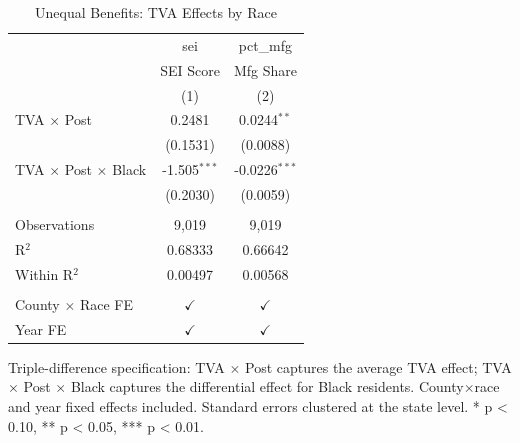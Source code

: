 
\begin{table}[htbp]
   \caption{\label{tab:race} Unequal Benefits: TVA Effects by Race}
   \bigskip
   \centering
   \begin{tabular}{lcc}
      \toprule
                                  & sei            & pct\_mfg\\   
                                  & SEI Score      & Mfg Share \\   
                                  & (1)            & (2)\\  
      \midrule 
      TVA $\times$ Post                  & 0.2481         & 0.0244$^{**}$\\   
                                  & (0.1531)       & (0.0088)\\   
      TVA $\times$ Post $\times$ Black            & -1.505$^{***}$ & -0.0226$^{***}$\\   
                                  & (0.2030)       & (0.0059)\\   
       \\
      Observations                & 9,019          & 9,019\\  
      R$^2$                       & 0.68333        & 0.66642\\  
      Within R$^2$                & 0.00497        & 0.00568\\  
       \\
      County $\times$ Race FE  & $\checkmark$   & $\checkmark$\\   
      Year FE          & $\checkmark$   & $\checkmark$\\   
      \bottomrule
   \end{tabular}
   
   \par \raggedright 
   Triple-difference specification: TVA $\times$ Post captures the average TVA effect; TVA $\times$ Post $\times$ Black captures the differential effect for Black residents. County$\times$race and year fixed effects included. Standard errors clustered at the state level. * p < 0.10, ** p < 0.05, *** p < 0.01.
\end{table}


